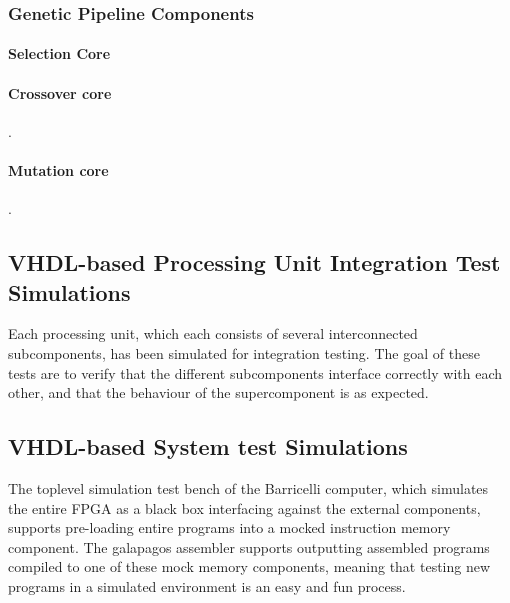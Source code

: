



\subsubsection{Genetic Pipeline Components}
\paragraph{Selection Core}



\newpage
\paragraph{Crossover core}
.





\newpage
\paragraph{Mutation core}
.




\subsection{\gls{VHDL}-based Processing Unit Integration Test Simulations}

Each processing unit, which each consists of several interconnected subcomponents, has been simulated for integration testing.
The goal of these tests are to verify that the different subcomponents interface correctly with each other, and that the behaviour of the supercomponent is as expected.


\subsection{\gls{VHDL}-based System test Simulations}
\label{section:testing:fpga:system-tests}

The toplevel simulation test bench of the Barricelli computer, which simulates the entire FPGA as a black box interfacing against the external components, supports pre-loading entire programs into a mocked instruction memory component.
The \Gls{galapagos assembler} supports outputting assembled programs compiled to one of these mock memory components, meaning that testing new programs in a simulated environment is an easy and fun process.

